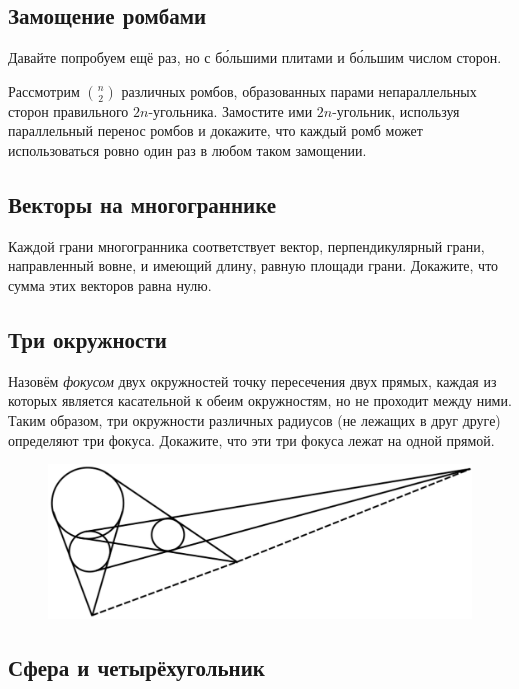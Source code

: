 \subsection*{Замощение ромбами}%

Давайте попробуем ещё раз, но с б\'{о}льшими плитами и б\'{о}льшим числом сторон.


Рассмотрим $\binom n2$ различных ромбов, образованных парами непараллельных сторон правильного $2n$-угольника.
Замостите ими $2n$-угольник, используя параллельный перенос ромбов
и докажите, что каждый ромб может использоваться ровно один раз в любом таком замощении.

\subsection*{Векторы на многограннике}%

Каждой грани многогранника соответствует вектор, перпендикулярный грани, направленный вовне, и имеющий длину, равную площади грани.
Докажите, что сумма этих векторов равна нулю.

\subsection*{Три окружности}%

Назовём \emph{фокусом} двух окружностей точку пересечения двух прямых, каждая из которых является касательной к обеим окружностям, но не проходит между ними.
Таким образом, три окружности различных радиусов (не лежащих в друг друге)
определяют три фокуса.
Докажите, что эти три фокуса лежат на одной прямой.

\begin{figure}[h!]
\centering
\includegraphics[scale=0.5]{Figs/Geometry/foci}
\end{figure} 

\subsection*{Сфера и четырёхугольник}%

